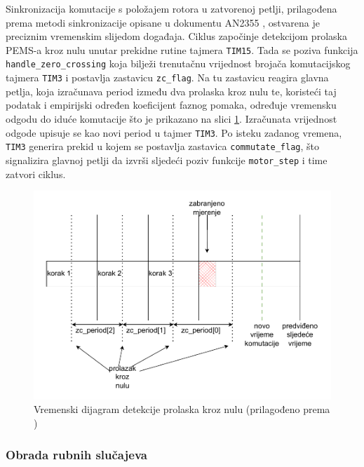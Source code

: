 \documentclass[diplomskirad]{fer}
\begin{document}
Sinkronizacija komutacije s položajem rotora u zatvorenoj petlji, prilagođena
prema metodi sinkronizacije opisane u dokumentu AN2355 \cite{NXP_AN2355},
ostvarena je preciznim vremenskim slijedom događaja. Ciklus započinje
detekcijom prolaska PEMS-a kroz nulu unutar prekidne rutine tajmera
\texttt{TIM15}. Tada se poziva funkcija \texttt{handle\_zero\_crossing} koja
bilježi trenutačnu vrijednost brojača komutacijskog tajmera \texttt{TIM3} i
postavlja zastavicu \texttt{zc\_flag}. Na tu zastavicu reagira glavna petlja,
koja izračunava period između dva prolaska kroz nulu te, koristeći taj podatak
i empirijski određen koeficijent faznog pomaka, određuje vremensku odgodu do
iduće komutacije što je prikazano na slici \ref{fig:closed_loop_zc}. Izračunata
vrijednost odgode upisuje se kao novi period u tajmer \texttt{TIM3}. Po isteku
zadanog vremena, \texttt{TIM3} generira prekid u kojem se postavlja zastavica
\texttt{commutate\_flag}, što signalizira glavnoj petlji da izvrši sljedeći
poziv funkcije \texttt{motor\_step} i time zatvori ciklus.

\begin{figure}[h!]
	\centering
	\includegraphics[width=\textwidth]{csv/closed_loop_zc.pdf}
	\caption{Vremenski dijagram detekcije prolaska kroz nulu (prilagođeno prema \cite{NXP_AN2355})}
	\label{fig:closed_loop_zc}
\end{figure}

\subsubsection{Obrada rubnih slučajeva}
\label{sssec:rubni_slucajevi}
\end{document}

